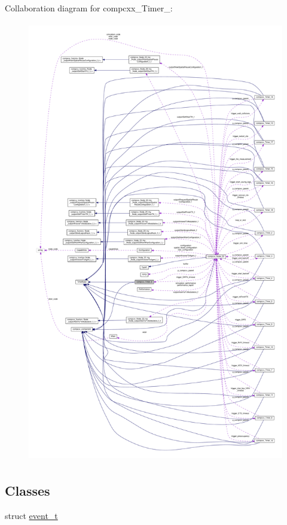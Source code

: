 Collaboration diagram for compcxx\+\_\+\+Timer\+\_\+:\nopagebreak
\begin{figure}[H]
\begin{center}
\leavevmode
\includegraphics[height=550pt]{classcompcxx__Timer__9__coll__graph}
\end{center}
\end{figure}
\subsection*{Classes}
\begin{DoxyCompactItemize}
\item 
struct \hyperlink{structcompcxx__Timer__9_1_1event__t}{event\+\_\+t}
\end{DoxyCompactItemize}
